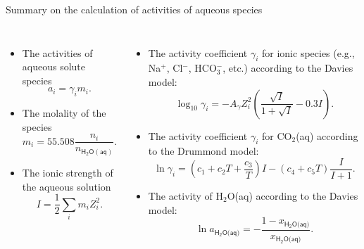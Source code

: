 %
%
\begin{frame}[shrink=10]{Summary on the calculation of activities of aqueous species}
	\begin{columns}[t]
		
		\begin{itemize}[<+->]
			\item  The \alert{activities} of aqueous solute species 
			\[
			a_{i}=\gamma_{i}m_{i}.
			\]
			\item The \alert{molality} of the species 
			\[
			m_{i}=55.508\frac{n_{i}}{n_{\mathsf{H_{2}O(aq)}}}.
			\]
			\item The \alert{ionic strength} of the aqueous solution 
			\[
			I=\frac{1}{2}\sum_{i}m_{i}Z_{i}^{2}.
			\]
		\end{itemize}
		
		\begin{itemize}[<+->]
			\item  The \alert{activity coefficient} $\gamma_{i}$  for  \alert{ionic species}
			(e.g., Na$^{+}$, Cl$^{-}$, HCO$_{3}^{-}$, etc.) according to the Davies model:
			\[
			\log_{10}\gamma_{i}=-A_{\gamma}Z_{i}^{2}\left(\dfrac{\sqrt{I}}{1+\sqrt{I}}-0.3I\right).
			\]
			\item The \alert{activity coefficient} $\gamma_{i}$ for  \alert{CO$_{2}$(aq)} according to the Drummond model:
			\[
			\ln\gamma_{i}=\left(c_{1}+c_{2}T+\frac{c_{3}}{T}\right)I-(c_{4}+c_{5}T)\frac{I}{I+1}.
			\]
			\item The \alert{activity of H$_{2}$O(aq)} according to the Davies model:
			\[
			\ln a_{\mathsf{H_{2}O\text{(aq)}}}=-\frac{1-x_{\mathsf{\mathsf{H_{2}O\text{(aq)}}}}}{x_{\mathsf{\mathsf{H_{2}O\text{(aq)}}}}}.
			\]
		\end{itemize}
	\end{columns}
	
\end{frame}
%
%
